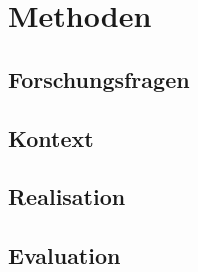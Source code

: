 \chapter{Methoden}

\lipsum[3-5]

\section{Forschungsfragen}

\lipsum[3-5]

\section{Kontext}

\lipsum[3-5]

\section{Realisation}

\lipsum[3-5]

\section{Evaluation}

\lipsum[3-5]

